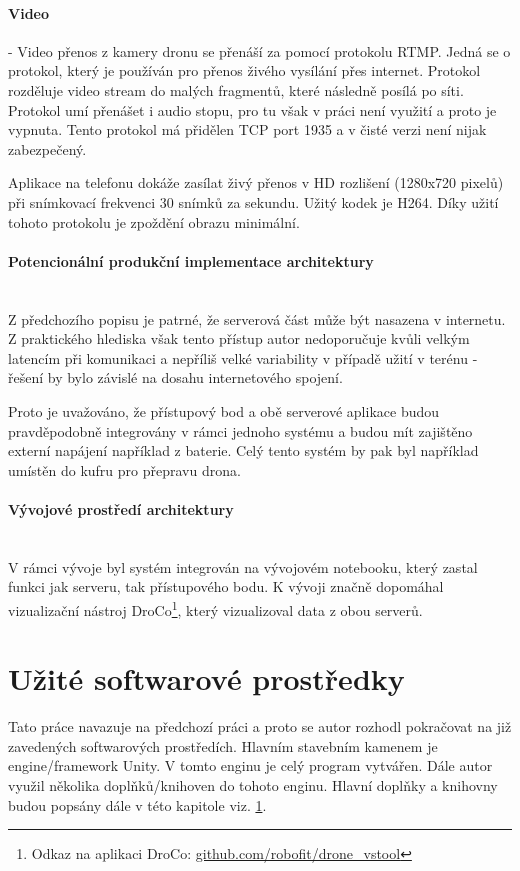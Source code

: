 \paragraph{Video} - Video přenos z kamery dronu se přenáší za pomocí protokolu RTMP. Jedná se o protokol, který je používán pro přenos živého vysílání přes internet. Protokol rozděluje video stream do malých fragmentů, které následně posílá po síti. Protokol umí přenášet i audio stopu, pro tu však v práci není využití a proto je vypnuta. Tento protokol má přidělen TCP port 1935 a v čisté verzi není nijak zabezpečený\cite{RTMP}. 

Aplikace na telefonu dokáže zasílat živý přenos v HD rozlišení (1280x720 pixelů) při snímkovací frekvenci 30 snímků za sekundu. Užitý kodek je H264. Díky užití tohoto protokolu je zpoždění obrazu minimální.

\paragraph{Potencionální produkční implementace architektury}\mbox{} \\
Z předchozího popisu je patrné, že serverová část může být nasazena v internetu. Z praktického hlediska však tento přístup autor nedoporučuje kvůli velkým latencím při komunikaci a nepříliš velké variability v případě užití v terénu - řešení by bylo závislé na dosahu internetového spojení. 

Proto je uvažováno, že přístupový bod a obě serverové aplikace budou pravděpodobně integrovány v rámci jednoho systému a budou mít zajištěno externí napájení například z baterie. Celý tento systém by pak byl například umístěn do kufru pro přepravu drona. 

\paragraph{Vývojové prostředí architektury}\mbox{} \\
V rámci vývoje byl  systém integrován na vývojovém notebooku, který zastal funkci jak serveru, tak přístupového bodu. K vývoji značně dopomáhal vizualizační nástroj  DroCo\footnote{Odkaz na aplikaci DroCo: \href{https://github.com/robofit/drone\_vstool}{github.com/robofit/drone\_vstool}}, který vizualizoval data z obou serverů.

\section{Užité softwarové prostředky}
Tato práce navazuje na předchozí práci \cite{KyjacMartin2022Vnpp} a proto se autor rozhodl pokračovat na již zavedených softwarových prostředích. Hlavním stavebním kamenem je engine/framework Unity. V tomto enginu je celý program vytvářen. Dále autor využil několika doplňků/knihoven do tohoto enginu. Hlavní doplňky a knihovny budou popsány dále v této kapitole viz. \ref{}. 

